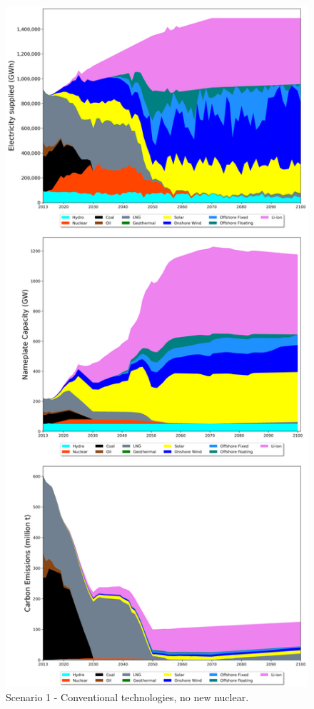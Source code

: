 \begin{figure}[htb] 
\centering
\vspace*{-3cm}
\includegraphics[scale=0.42]{figures/conv_nonuc}
\caption{Scenario 1 - Conventional technologies, no new nuclear.}
\label{scen1}
\end{figure}

